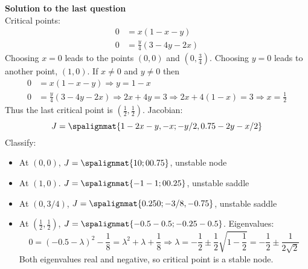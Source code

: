 \documentclass[12pt]{exam}
\begin{document}

\newpage 

\textbf{Solution to the last question} \\
Critical points: 
\begin{align}
    0 &= x(1-x-y) \\
    0 &= \frac y4 (3-4y -2x)
\end{align}
Choosing $x=0$ leads to the points $(0,0)$ and $(0,\frac 34)$. Choosing $y=0$ leads to another point, $(1,0)$. If $x\ne0$ and $y\ne0$ then 
\begin{align*}
        0 &= x(1-x-y) \Rightarrow y = 1 - x\\
    0 &= \frac y4 (3-4y -2x) \Rightarrow 2x + 4y = 3 \Rightarrow 2x + 4(1 - x) = 3 \Rightarrow x = \frac 12
\end{align*}
Thus the last critical point is $(\frac 12, \frac 12)$. Jacobian: 
$$J = \spalignmat{1-2x-y,-x;-y/2,0.75-2y-x/2}$$
Classify: 
\begin{itemize}
    \item At $(0,0)$, $J = \spalignmat{1 0;0 0.75}$, unstable node
    \item At $(1,0)$. $J = \spalignmat{-1 -1;0 0.25}$, unstable saddle
    \item At $(0,3/4)$, $J = \spalignmat{0.25 0; -3/8, -0.75}$, unstable saddle
    \item At $(\frac 12, \frac 12)$, $J = \spalignmat{-0.5 -0.5;-0.25 -0.5}$. Eigenvalues: 
    $$0 = (-0.5 - \lambda)^2 - \frac 18 = \lambda^2 + \lambda + \frac 18 \Rightarrow \lambda = -\frac12 \pm \frac 12 \sqrt{1 - \frac12}=-\frac12 \pm \frac{1}{2\sqrt{2}}$$
    Both eigenvalues real and negative, so critical point is a stable node. 
\end{itemize}
\end{document}
